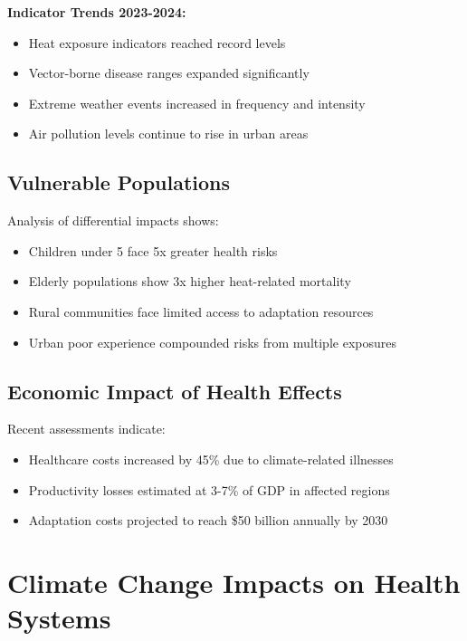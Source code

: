 \begin{keymessage}
\textbf{Indicator Trends 2023-2024:}
\begin{itemize}
    \item Heat exposure indicators reached record levels
    \item Vector-borne disease ranges expanded significantly
    \item Extreme weather events increased in frequency and intensity
    \item Air pollution levels continue to rise in urban areas
\end{itemize}
\end{keymessage}

\subsection{Vulnerable Populations}
Analysis of differential impacts shows:

\begin{itemize}
    \item Children under 5 face 5x greater health risks
    \item Elderly populations show 3x higher heat-related mortality
    \item Rural communities face limited access to adaptation resources
    \item Urban poor experience compounded risks from multiple exposures
\end{itemize}

\subsection{Economic Impact of Health Effects}
Recent assessments indicate:

\begin{itemize}
    \item Healthcare costs increased by 45\% due to climate-related illnesses
    \item Productivity losses estimated at 3-7\% of GDP in affected regions
    \item Adaptation costs projected to reach \$50 billion annually by 2030
\end{itemize}

\section{Climate Change Impacts on Health Systems}

